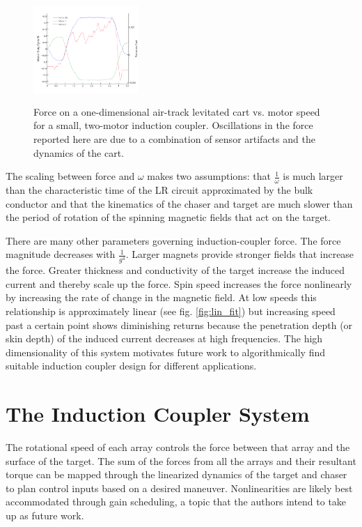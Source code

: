 \documentclass{article}
\begin{document}
\begin{figure}
\includegraphics[width = 4cm, height = 4cm ]{figures/motor_force_speed_plot.png}

\caption{Force on a one-dimensional air-track levitated cart vs. motor speed for a small, two-motor induction coupler. Oscillations in the force reported here are due to a combination of sensor artifacts and the dynamics of the cart.}
\label{fig:force_plot}
\end{figure}

The scaling between force and $\omega$ makes two assumptions: that $\frac{1}{\omega}$ is much larger than the characteristic time of the LR circuit approximated by the bulk conductor and that the kinematics of the chaser and target are much slower than the period of rotation of the spinning magnetic fields that act on the target.

There are many other parameters governing induction-coupler force. The force magnitude decreases with $\frac{1}{g^4}$. Larger magnets provide stronger fields that increase the force. Greater thickness and 
conductivity of the target increase the induced current and thereby scale up the force. Spin speed increases the force nonlinearly by increasing the rate of change in the magnetic field. At low speeds this relationship is approximately linear (see fig. \ref{fig:lin_fit}) but increasing speed past a certain point shows diminishing returns because the penetration depth (or skin depth) of the induced current decreases at high frequencies. \cite{Paudel2013} The high dimensionality of this system motivates future work to algorithmically find suitable induction coupler design for different applications.\section{The Induction Coupler System}

The rotational speed of each array controls the force between that array and the surface of the target. The sum of the forces from all the arrays and their resultant torque can be mapped through the linearized dynamics of the target and chaser to plan control inputs based on a desired maneuver. Nonlinearities are likely best accommodated through gain scheduling, a topic that the authors intend to take up as future work.
\end{document}
